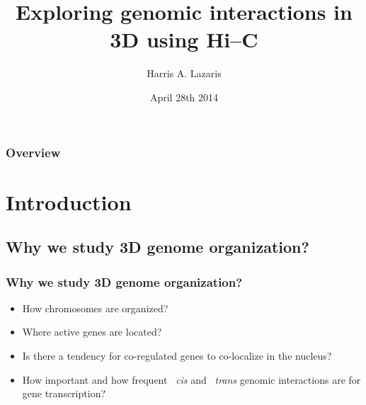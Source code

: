\documentclass{beamer}
\title[Hi--C evaluation]{Exploring genomic interactions in 3D using Hi--C} %
\author{Harris A. Lazaris} %
\date{April 28th 2014} %
\begin{document}
\begin{frame}
\titlepage %
\end{frame}

\begin{frame}
\frametitle{Overview} %
\tableofcontents %
\end{frame}


\section{Introduction} %
\subsection{Why we study 3D genome organization?}
\begin{frame}
\frametitle{Why we study 3D genome organization?}
\begin{itemize}
\item How chromosomes are organized?
\item Where active genes are located?
\item Is there a tendency for co-regulated genes to co-localize in the nucleus?
\item How important and how frequent ~\emph{cis} and ~\emph{trans} genomic
interactions are for gene transcription?
\end{itemize}
\end{frame}
\end{document}
